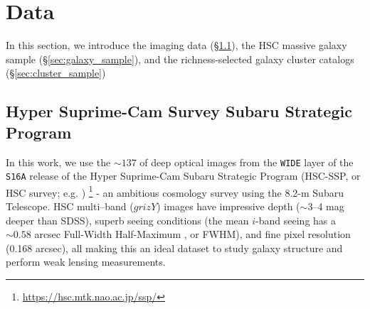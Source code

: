 \documentclass[fleqn,usenatbib,useAMS,english]{mnras}
\begin{document}
\section{Data}
    \label{sec:data}

    In this section, we introduce the imaging data  (\S \ref{sec:hsc}), the HSC massive
    galaxy sample (\S \ref{sec:galaxy_sample}), and the richness-selected galaxy cluster
    catalogs (\S \ref{sec:cluster_sample})

\subsection{Hyper Suprime-Cam Survey Subaru Strategic Program}
    \label{sec:hsc}

    In this work, we use the $\sim 137$ \sqdeg{} of deep optical images from the \texttt{WIDE}
    layer of the \texttt{S16A} release of the Hyper Suprime-Cam Subaru Strategic Program
    (HSC-SSP, or HSC survey; e.g. \citealt{HSC-SSP, HSC-DR1, HSC-DR2})
    \footnote{\url{https://hsc.mtk.nao.ac.jp/ssp/}} - an ambitious cosmology survey using the
    8.2-m Subaru Telescope.
    HSC multi--band ($grizY$) images have impressive depth ($\sim$3--4 mag deeper than
    SDSS), superb seeing conditions (the mean $i$-band seeing has a $\sim 0.58$ arcsec Full-Width
    Half-Maximum , or FWHM), and fine pixel resolution (0.168 arcsec), all making this an ideal
    dataset to study galaxy structure and perform weak lensing measurements.
\end{document}
